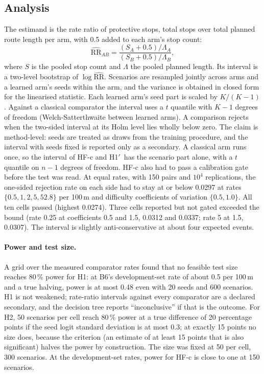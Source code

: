 \documentclass[11pt]{article}
\newcommand{\Hprime}{H1$'$}
\theoremstyle{definition}
\begin{document}
\subsection{Analysis}
The estimand is the rate ratio of protective stops, total stops over total planned route length per arm,
with 0.5 added to each arm's stop count:
\begin{equation}
\widehat{\mathrm{RR}}_{AB}=\frac{(S_A+0.5)/\Lambda_A}{(S_B+0.5)/\Lambda_B},
\label{eq:rr}
\end{equation}
where $S$ is the pooled stop count and $\Lambda$ the pooled planned length. Its interval is a two-level
bootstrap of $\log\widehat{\mathrm{RR}}$. Scenarios are resampled jointly across arms and a learned arm's
seeds within the arm, and the variance is obtained in closed form for the linearised statistic. Each
learned arm's seed part is scaled by $K/(K-1)$. Against a classical comparator the interval uses a $t$ quantile with
$K-1$ degrees of freedom (Welch-Satterthwaite between learned arms). A comparison rejects
when the two-sided interval at its Holm level lies wholly below zero. The claim is method-level: seeds are
treated as draws from the training procedure, and the interval with seeds fixed is reported only as a
secondary. A classical arm runs once, so the interval of HF-c and \Hprime\ has the scenario part alone, with a
$t$ quantile on $n-1$ degrees of freedom. HF-c also had to pass a calibration gate before the test was read. At
equal rates, with 150 pairs and $10^4$ replications, the one-sided rejection rate on each side had to stay
at or below 0.0297 at rates $\{0.5,1,2,5,52.8\}$ per 100\,m and difficulty coefficients of variation
$\{0.5,1.0\}$. All ten cells passed (highest 0.0274). Three cells reported but not gated exceeded the bound
(rate 0.25 at coefficients 0.5 and 1.5, 0.0312 and 0.0337; rate 5 at 1.5, 0.0307). The interval is slightly
anti-conservative at about four expected events.

\paragraph{Power and test size.} A grid over the measured comparator rates found that no feasible test size
reaches 80\,\% power for H1: at B6's development-set rate of about 0.5 per 100\,m and a true halving, power is
at most 0.48 even with 20 seeds and 600 scenarios. H1 is not weakened; rate-ratio intervals against every
comparator are a declared secondary, and the decision tree reports ``inconclusive'' if that is the outcome.
For H2, 50 scenarios per cell reach 80\,\% power at a true difference of 20 percentage points if the seed logit
standard deviation is at most 0.3; at exactly 15 points no size does, because the criterion (an estimate of at
least 15 points that is also significant) halves the power by construction. The size was fixed at 50 per cell,
300 scenarios. At the development-set rates, power for HF-c is close to one at 150 scenarios.
\end{document}

